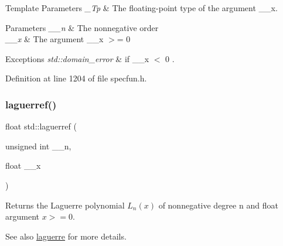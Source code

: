 \begin{DoxyTemplParams}{Template Parameters}
{\em \+\_\+\+Tp} & The floating-\/point type of the argument {\ttfamily \+\_\+\+\_\+x}. \\
\hline
\end{DoxyTemplParams}

\begin{DoxyParams}{Parameters}
{\em \+\_\+\+\_\+n} & The nonnegative order \\
\hline
{\em \+\_\+\+\_\+x} & The argument {\ttfamily  \+\_\+\+\_\+x $>$= 0 } \\
\hline
\end{DoxyParams}

\begin{DoxyExceptions}{Exceptions}
{\em std\+::domain\+\_\+error} & if {\ttfamily  \+\_\+\+\_\+x $<$ 0 }. \\
\hline
\end{DoxyExceptions}


Definition at line 1204 of file specfun.\+h.

\mbox{\label{group__cxx17__math__spec__func_gada763419b0e21b38e38daa8b6eb56a8c}} 
\subsubsection{\texorpdfstring{laguerref()}{laguerref()}}
{\footnotesize\ttfamily float std\+::laguerref (\begin{DoxyParamCaption}\item[{unsigned int}]{\+\_\+\+\_\+n,  }\item[{float}]{\+\_\+\+\_\+x }\end{DoxyParamCaption})\hspace{0.3cm}{\ttfamily [inline]}}

Returns the Laguerre polynomial $ L_n(x) $ of nonnegative degree {\ttfamily n} and {\ttfamily float} argument $ x >= 0 $.

\begin{DoxySeeAlso}{See also}
\hyperlink{group__cxx17__math__spec__func_ga9d7b24a11dad27690387405548973ef9}{laguerre} for more details. 
\end{DoxySeeAlso}


